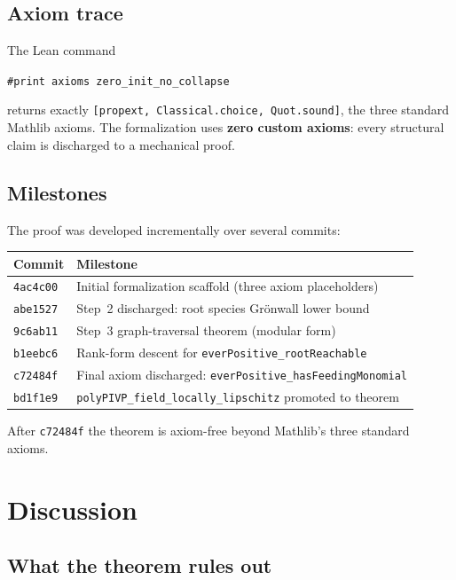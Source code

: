 \documentclass[11pt]{article}
\begin{document}
\subsection*{Axiom trace}

The Lean command
\begin{center}
  \texttt{\#print axioms zero\_init\_no\_collapse}
\end{center}
returns exactly \texttt{[propext, Classical.choice, Quot.sound]}, the three
standard Mathlib axioms. The formalization uses \textbf{zero custom axioms}:
every structural claim is discharged to a mechanical proof.

\subsection*{Milestones}

The proof was developed incrementally over several commits:

\begin{center}
\begin{tabular}{ll}
\hline
Commit & Milestone \\
\hline
\texttt{4ac4c00} & Initial formalization scaffold (three axiom placeholders) \\
\texttt{abe1527} & Step~2 discharged: root species Gr\"onwall lower bound \\
\texttt{9c6ab11} & Step~3 graph-traversal theorem (modular form) \\
\texttt{b1eebc6} & Rank-form descent for \texttt{everPositive\_rootReachable} \\
\texttt{c72484f} & Final axiom discharged: \texttt{everPositive\_hasFeedingMonomial} \\
\texttt{bd1f1e9} & \texttt{polyPIVP\_field\_locally\_lipschitz} promoted to theorem \\
\hline
\end{tabular}
\end{center}

After \texttt{c72484f} the theorem is axiom-free beyond Mathlib's three
standard axioms.

\section{Discussion}

\subsection{What the theorem rules out}
\end{document}
